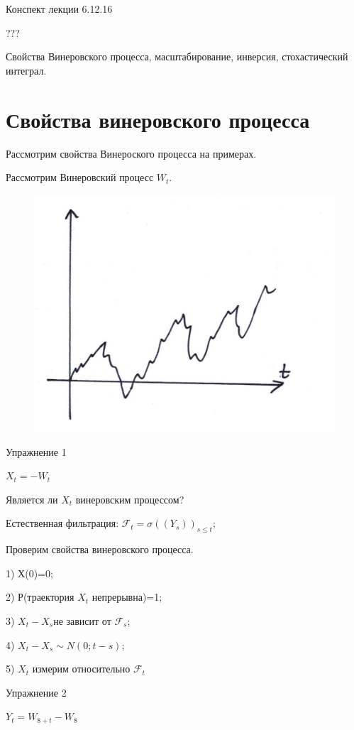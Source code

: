 \documentclass[a4paper]{article}
\begin{document}
 \begin{center}
 {\Large{Конспект лекции 6.12.16}}
 \end{center}
  \begin{center}
 {\large{???}}
 \end{center}


Свойства Винеровского процесса, масштабирование, инверсия, стохастический интеграл.



\section*{Свойства винеровского процесса}

Рассмотрим свойства Винероского процесса на примерах.

Рассмотрим Винеровский процесс $W_t$.

\begin{figure}[h!]
\includegraphics[width=0.5\linewidth]{04_lecture}
\end{figure}


Упражнение 1

\parindent=1cm

$X_t= - W_t$

Является ли $X_t$ винеровским процессом?

Естественная фильтрация: $\mathcal{F}_t=\sigma((Y_s))_{s\le t}$;

Проверим свойства винеровского процесса.

1) Х(0)=0;

2) Р(траектория $X_t$ непрерывна)=1;

3) $X_t-X_s$не зависит от $\mathcal{F}_s$;

4) $X_t-X_s \sim N(0;t-s)$;

5) $X_t$ измерим относительно  $\mathcal{F}_t$

Упражнение 2

\parindent=1cm

$Y_t=W_{8+t}-W_8$
\end{document}
